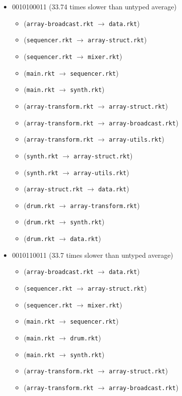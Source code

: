 \documentclass{article}
\newcommand{\mono}[1]{\texttt{#1}}
\begin{document}
\begin{itemize}
\item 0010100011 (33.74 times slower than untyped average)
  \begin{itemize}
  \item (\mono{array-broadcast.rkt} $\rightarrow$ \mono{data.rkt})
  \item (\mono{sequencer.rkt} $\rightarrow$ \mono{array-struct.rkt})
  \item (\mono{sequencer.rkt} $\rightarrow$ \mono{mixer.rkt})
  \item (\mono{main.rkt} $\rightarrow$ \mono{sequencer.rkt})
  \item (\mono{main.rkt} $\rightarrow$ \mono{synth.rkt})
  \item (\mono{array-transform.rkt} $\rightarrow$ \mono{array-struct.rkt})
  \item (\mono{array-transform.rkt} $\rightarrow$ \mono{array-broadcast.rkt})
  \item (\mono{array-transform.rkt} $\rightarrow$ \mono{array-utils.rkt})
  \item (\mono{synth.rkt} $\rightarrow$ \mono{array-struct.rkt})
  \item (\mono{synth.rkt} $\rightarrow$ \mono{array-utils.rkt})
  \item (\mono{array-struct.rkt} $\rightarrow$ \mono{data.rkt})
  \item (\mono{drum.rkt} $\rightarrow$ \mono{array-transform.rkt})
  \item (\mono{drum.rkt} $\rightarrow$ \mono{synth.rkt})
  \item (\mono{drum.rkt} $\rightarrow$ \mono{data.rkt})
  \end{itemize}
\item 0010110011 (33.7 times slower than untyped average)
  \begin{itemize}
  \item (\mono{array-broadcast.rkt} $\rightarrow$ \mono{data.rkt})
  \item (\mono{sequencer.rkt} $\rightarrow$ \mono{array-struct.rkt})
  \item (\mono{sequencer.rkt} $\rightarrow$ \mono{mixer.rkt})
  \item (\mono{main.rkt} $\rightarrow$ \mono{sequencer.rkt})
  \item (\mono{main.rkt} $\rightarrow$ \mono{drum.rkt})
  \item (\mono{main.rkt} $\rightarrow$ \mono{synth.rkt})
  \item (\mono{array-transform.rkt} $\rightarrow$ \mono{array-struct.rkt})
  \item (\mono{array-transform.rkt} $\rightarrow$ \mono{array-broadcast.rkt})

\end{itemize}
\end{itemize}
\end{document}
